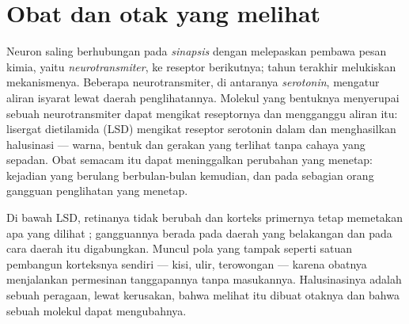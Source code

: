 \section{Obat dan otak yang melihat}

\begin{proposition}\label{prop:g11:vision-and-brain:drugs}
Neuron saling berhubungan pada \emph{sinapsis} dengan melepaskan
pembawa pesan kimia, yaitu \emph{neurotransmiter}, ke reseptor 
berikutnya; tahun terakhir melukiskan mekanismenya. Beberapa
neurotransmiter, di antaranya \emph{serotonin}, mengatur aliran isyarat
lewat daerah penglihatannya. Molekul yang bentuknya menyerupai sebuah
neurotransmiter dapat mengikat reseptornya dan mengganggu aliran itu:
lisergat dietilamida (LSD) mengikat reseptor serotonin dalam  dan menghasilkan halusinasi --- warna, bentuk dan
gerakan yang terlihat tanpa cahaya yang sepadan. Obat semacam itu dapat
meninggalkan perubahan yang menetap: kejadian yang berulang
berbulan-bulan kemudian, dan pada sebagian orang gangguan penglihatan
yang menetap.
\end{proposition}
\admitted

\begin{example}\label{ex:g11:vision-and-brain:hallucination}
Di bawah LSD, retinanya tidak berubah dan korteks primernya tetap
memetakan apa yang dilihat ; gangguannya berada pada daerah yang
belakangan dan pada cara daerah itu digabungkan. Muncul pola yang
tampak seperti satuan pembangun korteksnya sendiri --- kisi, ulir,
terowongan --- karena obatnya menjalankan permesinan tanggapannya tanpa
masukannya. Halusinasinya adalah sebuah peragaan, lewat kerusakan,
bahwa melihat itu dibuat otaknya dan bahwa sebuah molekul dapat
mengubahnya.
\end{example}

